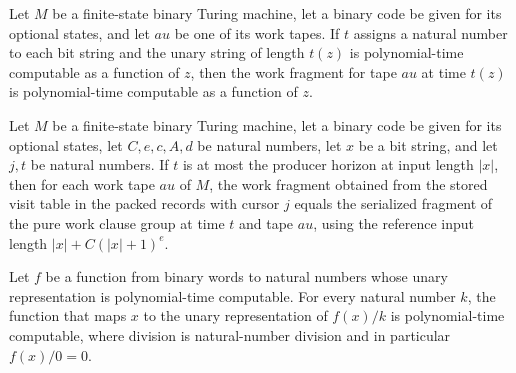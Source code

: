 \begin{lemma}
\label{Complexity.clA5WorkFragment_native}
\leanok
{}
Let $M$ be a finite-state binary Turing machine, let a binary code be given for its
optional states, and let $	au$ be one of its work tapes. If $t$ assigns a natural number
to each bit string and the unary string of length $t(z)$ is polynomial-time computable
as a function of $z$, then the work fragment for tape $	au$ at time $t(z)$ is
polynomial-time computable as a function of $z$.
\end{lemma}

\begin{lemma}
\label{Complexity.clA5WorkFragment_exact}
\leanok
{}
Let $M$ be a finite-state binary Turing machine, let a binary code be given for its
optional states, let $C,e,c,A,d$ be natural numbers, let $x$ be a bit string, and let
$j,t$ be natural numbers. If $t$ is at most the producer horizon at input length $|x|$,
then for each work tape $	au$ of $M$, the work fragment obtained from the stored visit
table in the packed records with cursor $j$ equals the serialized fragment of the pure
work clause group at time $t$ and tape $	au$, using the reference input length
$|x|+C(|x|+1)^e$.
\end{lemma}

\begin{lemma}
\label{Complexity.clA5Div_native}
\leanok
{}
Let $f$ be a function from binary words to natural numbers whose unary representation is
polynomial-time computable. For every natural number $k$, the function that maps $x$ to
the unary representation of $f(x)/k$ is polynomial-time computable, where division is
natural-number division and in particular $f(x)/0=0$.
\end{lemma}

